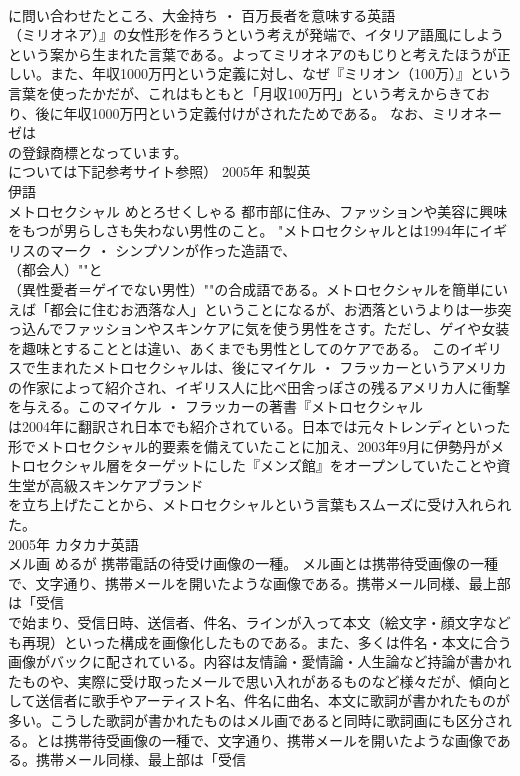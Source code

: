 \documentclass[8pt]{extreport}
\begin{document}
\begin{CJK}{UTF8}{min}
\\	に問い合わせたところ、大金持ち ・ 百万長者を意味する英語
\\	（ミリオネア）』の女性形を作ろうという考えが発端で、イタリア語風にしようという案から生まれた言葉である。よってミリオネアのもじりと考えたほうが正しい。また、年収1000万円という定義に対し、なぜ『ミリオン（100万）』という言葉を使ったかだが、これはもともと「月収100万円」という考えからきており、後に年収1000万円という定義付けがされたためである。 なお、ミリオネーゼは
\\	の登録商標となっています。
\\	については下記参考サイト参照）	2005年	和製英 
\\	伊語	
\\	メトロセクシャル	めとろせくしゃる	都市部に住み、ファッションや美容に興味をもつが男らしさも失わない男性のこと。	"メトロセクシャルとは1994年にイギリスのマーク ・ シンプソンが作った造語で、
\\	（都会人）""と
\\	（異性愛者＝ゲイでない男性）""の合成語である。メトロセクシャルを簡単にいえば「都会に住むお洒落な人」ということになるが、お洒落というよりは一歩突っ込んでファッションやスキンケアに気を使う男性をさす。ただし、ゲイや女装を趣味とすることとは違い、あくまでも男性としてのケアである。 このイギリスで生まれたメトロセクシャルは、後にマイケル ・ フラッカーというアメリカの作家によって紹介され、イギリス人に比べ田舎っぽさの残るアメリカ人に衝撃を与える。このマイケル ・ フラッカーの著書『メトロセクシャル 
\\	は2004年に翻訳され日本でも紹介されている。日本では元々トレンディといった形でメトロセクシャル的要素を備えていたことに加え、2003年9月に伊勢丹がメトロセクシャル層をターゲットにした『メンズ館』をオープンしていたことや資生堂が高級スキンケアブランド
\\	を立ち上げたことから、メトロセクシャルという言葉もスムーズに受け入れられた。
\\	2005年	カタカナ英語	
\\	メル画	めるが	携帯電話の待受け画像の一種。	メル画とは携帯待受画像の一種で、文字通り、携帯メールを開いたような画像である。携帯メール同様、最上部は「受信 
\\	で始まり、受信日時、送信者、件名、ラインが入って本文（絵文字・顔文字なども再現）といった構成を画像化したものである。また、多くは件名・本文に合う画像がバックに配されている。内容は友情論・愛情論・人生論など持論が書かれたものや、実際に受け取ったメールで思い入れがあるものなど様々だが、傾向として送信者に歌手やアーティスト名、件名に曲名、本文に歌詞が書かれたものが多い。こうした歌詞が書かれたものはメル画であると同時に歌詞画にも区分される。とは携帯待受画像の一種で、文字通り、携帯メールを開いたような画像である。携帯メール同様、最上部は「受信 

\end{CJK}
\end{document}
